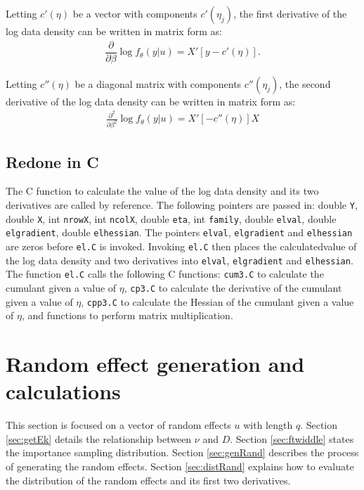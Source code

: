 \documentclass{article}
\begin{document}
Letting $c'(\eta)$ be a vector with components $c'(\eta_j)$, the first derivative of the log data density can be written in matrix form as:
\begin{align}
\dfrac{\partial}{\partial \beta}  \log f_\theta(y|u) = X' \left[ y-  c'(\eta)  \right].
\end{align}

Letting $ c''(\eta)$ be a diagonal matrix with components $c''(\eta_j)$, the second derivative of the log data density can be written in matrix form as:
\begin{align}
   \frac{\partial^2}{\partial \beta^2} \log f_\theta(y|u) =   X' [ -  c''(\eta) ] X
\end{align}

\subsection{Redone in C}
The C function to calculate the value of the log data density and its two derivatives are called by reference. The following pointers are passed in: double \texttt{Y}, double \texttt{X}, int \texttt{nrowX}, int \texttt{ncolX}, double \texttt{eta}, int \texttt{family}, double \texttt{elval}, double \texttt{elgradient}, double \texttt{elhessian}. The pointers  \texttt{elval}, \texttt{elgradient} and \texttt{elhessian} are zeros before \texttt{el.C} is invoked. Invoking \texttt{el.C}  then places the calculatedvalue of the log data density and two derivatives into \texttt{elval}, \texttt{elgradient} and \texttt{elhessian}.\\

The function \texttt{el.C} calls the following C functions: \texttt{cum3.C} to calculate the cumulant given a value of $\eta$, \texttt{cp3.C} to calculate the derivative of the cumulant given a value of $\eta$, \texttt{cpp3.C} to calculate the Hessian of the cumulant given a value of $\eta$, and functions to perform matrix multiplication.


\section{Random effect generation and calculations}
This section is focused on a vector of random effects $u$ with length $q$.  Section \ref{sec:getEk} details the  relationship between  $\nu$ and $D$.
Section \ref{sec:ftwiddle} states the importance sampling distribution.
 Section \ref{sec:genRand} describes the process of generating the random effects. Section \ref{sec:distRand} explains how to evaluate the distribution of the random effects and its first two derivatives.
\end{document}
